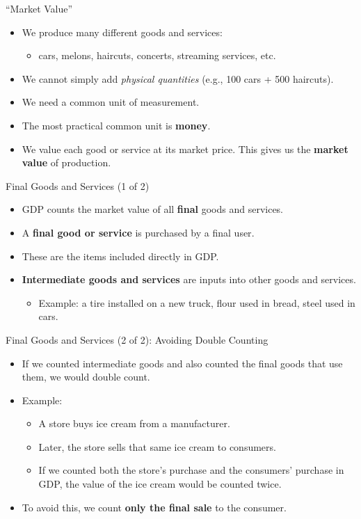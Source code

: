 \documentclass[aspectratio=169]{beamer}
\begin{document}
\begin{frame}{``Market Value''}
\transfade
\begin{itemize}
  \item We produce many different goods and services:
  \begin{itemize}
    \item cars, melons, haircuts, concerts, streaming services, etc.
  \end{itemize}
  \item We cannot simply add \emph{physical quantities} (e.g., 100 cars + 500 haircuts).
  \item We need a \alert{common unit of measurement}.
  \item The most practical common unit is \textbf{money}.
  \item We value each good or service at its \alert{market price}.  
  This gives us the \textbf{market value} of production.
\end{itemize}
\end{frame}

\begin{frame}{Final Goods and Services (1 of 2)}
\transfade
\begin{itemize}
  \item GDP counts the market value of all \textbf{final} goods and services.
  \item A \textbf{final good or service} is purchased by a \alert{final user}.
  \item These are the items included directly in GDP.
  \item \textbf{Intermediate goods and services} are inputs into other goods and services.
  \begin{itemize}
    \item Example: a tire installed on a new truck, flour used in bread, steel used in cars.
  \end{itemize}
\end{itemize}
\end{frame}

\begin{frame}{Final Goods and Services (2 of 2): Avoiding Double Counting}
\transfade
\begin{itemize}
  \item If we counted intermediate goods and also counted the final goods that use them, we would \alert{double count}.
  \item Example:
  \begin{itemize}
    \item A store buys ice cream from a manufacturer.
    \item Later, the store sells that same ice cream to consumers.
    \item If we counted both the store's purchase and the consumers' purchase in GDP, the value of the ice cream would be counted twice.
  \end{itemize}
  \item To avoid this, we count \textbf{only the final sale} to the consumer.
\end{itemize}
\end{frame}
\end{document}
